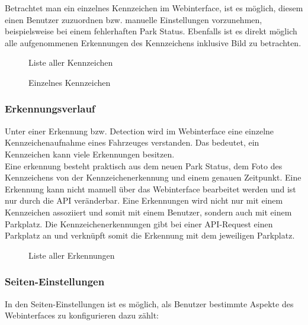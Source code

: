 Betrachtet man ein einzelnes Kennzeichen im Webinterface, ist es möglich, diesem
einen Benutzer zuzuordnen bzw. manuelle Einstellungen vorzunehmen, beispielsweise
bei einem fehlerhaften Park Status. Ebenfalls ist es direkt möglich alle
aufgenommenen Erkennungen des Kennzeichens inklusive Bild zu betrachten.

\begin{figure}[H]
  \centering
  \caption{Liste aller Kennzeichen}
\end{figure}

\begin{figure}[H]
  \centering
  \caption{Einzelnes Kennzeichen}
\end{figure}

\subsubsection{Erkennungsverlauf}
Unter einer Erkennung bzw. Detection wird im Webinterface eine einzelne
Kennzeichenaufnahme eines Fahrzeuges verstanden. Das bedeutet, ein Kennzeichen
kann viele Erkennungen besitzen.\\

Eine erkennung besteht praktisch aus dem neuen Park Status, dem Foto des
Kennzeichens von der Kennzeichenerkennung und einem genauen Zeitpunkt. Eine
Erkennung kann nicht manuell über das Webinterface bearbeitet werden und ist nur
durch die API veränderbar. Eine Erkennungen wird nicht nur mit einem Kennzeichen
assoziiert und somit mit einem Benutzer, sondern auch mit einem Parkplatz. Die
Kennzeichenerkennungen gibt bei einer API-Request einen Parkplatz an und verknüpft
somit die Erkennung mit dem jeweiligen Parkplatz. 

\begin{figure}[H]
  \centering
  \caption{Liste aller Erkennungen}
\end{figure}

\subsubsection{Seiten-Einstellungen}
In den Seiten-Einstellungen ist es möglich, als Benutzer bestimmte Aspekte des
Webinterfaces zu konfigurieren dazu zählt:

